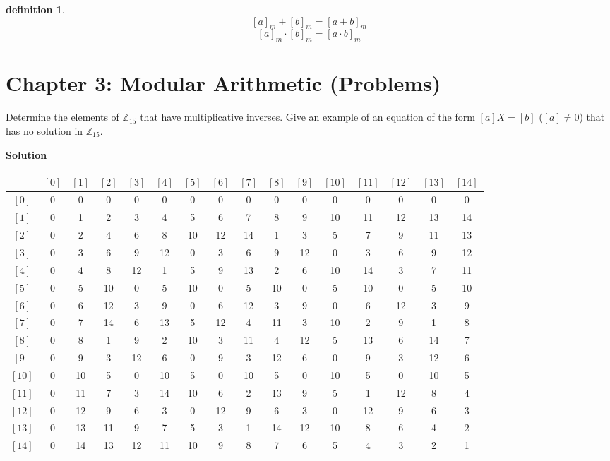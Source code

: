 \documentclass[8pt]{article}
\newtheorem{definition}{definition}
\begin{document}
\begin{definition}
    \[[a]_m + [b]_m = [a + b]_m\]
    \[[a]_m \cdot [b]_m = [a \cdot b]_m\]
\end{definition}

\section{Chapter 3: Modular Arithmetic (Problems)}

\begin{tcolorbox}[title=Problem 2, breakable]
    Determine the elements of $\mathbb{Z}_{15}$ that have multiplicative inverses.
    Give an example of an equation of the form $[a]X = [b]$ ($[a] \not = 0$)
    that has no solution in $\mathbb{Z}_{15}$.
\end{tcolorbox}

\textbf{Solution}

\begin{center}
\begin{tabular}{c | *{15}{c@{\hskip 2pt}}}
 & $[0]$ & $[1]$ & $[2]$ & $[3]$ & $[4]$ & $[5]$ & $[6]$ & $[7]$ & $[8]$ & $[9]$ & $[10]$ & $[11]$ & $[12]$ & $[13]$ & $[14]$ \\
\hline
$[0]$  & 0 & 0 & 0 & 0 & 0 & 0 & 0 & 0 & 0 & 0 & 0 & 0 & 0 & 0 & 0 \\
$[1]$  & 0 & 1 & 2 & 3 & 4 & 5 & 6 & 7 & 8 & 9 & 10 & 11 & 12 & 13 & 14 \\
$[2]$  & 0 & 2 & 4 & 6 & 8 & 10 & 12 & 14 & 1 & 3 & 5 & 7 & 9 & 11 & 13 \\
$[3]$  & 0 & 3 & 6 & 9 & 12 & 0 & 3 & 6 & 9 & 12 & 0 & 3 & 6 & 9 & 12 \\
$[4]$  & 0 & 4 & 8 & 12 & 1 & 5 & 9 & 13 & 2 & 6 & 10 & 14 & 3 & 7 & 11 \\
$[5]$  & 0 & 5 & 10 & 0 & 5 & 10 & 0 & 5 & 10 & 0 & 5 & 10 & 0 & 5 & 10 \\
$[6]$  & 0 & 6 & 12 & 3 & 9 & 0 & 6 & 12 & 3 & 9 & 0 & 6 & 12 & 3 & 9 \\
$[7]$  & 0 & 7 & 14 & 6 & 13 & 5 & 12 & 4 & 11 & 3 & 10 & 2 & 9 & 1 & 8 \\
$[8]$  & 0 & 8 & 1 & 9 & 2 & 10 & 3 & 11 & 4 & 12 & 5 & 13 & 6 & 14 & 7 \\
$[9]$  & 0 & 9 & 3 & 12 & 6 & 0 & 9 & 3 & 12 & 6 & 0 & 9 & 3 & 12 & 6 \\
$[10]$ & 0 & 10 & 5 & 0 & 10 & 5 & 0 & 10 & 5 & 0 & 10 & 5 & 0 & 10 & 5 \\
$[11]$ & 0 & 11 & 7 & 3 & 14 & 10 & 6 & 2 & 13 & 9 & 5 & 1 & 12 & 8 & 4 \\
$[12]$ & 0 & 12 & 9 & 6 & 3 & 0 & 12 & 9 & 6 & 3 & 0 & 12 & 9 & 6 & 3 \\
$[13]$ & 0 & 13 & 11 & 9 & 7 & 5 & 3 & 1 & 14 & 12 & 10 & 8 & 6 & 4 & 2 \\
$[14]$ & 0 & 14 & 13 & 12 & 11 & 10 & 9 & 8 & 7 & 6 & 5 & 4 & 3 & 2 & 1 \\
\end{tabular}
\end{center}
\end{document}

